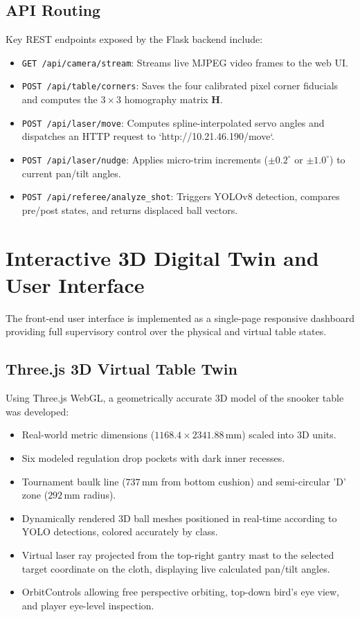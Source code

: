 \subsection{API Routing}
Key REST endpoints exposed by the Flask backend include:
\begin{itemize}
    \item \texttt{GET /api/camera/stream}: Streams live MJPEG video frames to the web UI.
    \item \texttt{POST /api/table/corners}: Saves the four calibrated pixel corner fiducials and computes the $3 \times 3$ homography matrix $\mathbf{H}$.
    \item \texttt{POST /api/laser/move}: Computes spline-interpolated servo angles and dispatches an HTTP request to `http://10.21.46.190/move`.
    \item \texttt{POST /api/laser/nudge}: Applies micro-trim increments ($\pm 0.2^\circ$ or $\pm 1.0^\circ$) to current pan/tilt angles.
    \item \texttt{POST /api/referee/analyze\_shot}: Triggers YOLOv8 detection, compares pre/post states, and returns displaced ball vectors.
\end{itemize}

\section{Interactive 3D Digital Twin and User Interface}
The front-end user interface is implemented as a single-page responsive dashboard providing full supervisory control over the physical and virtual table states.

\subsection{Three.js 3D Virtual Table Twin}
Using Three.js WebGL, a geometrically accurate 3D model of the snooker table was developed:
\begin{itemize}
    \item Real-world metric dimensions ($1168.4 \times 2341.88\,\text{mm}$) scaled into 3D units.
    \item Six modeled regulation drop pockets with dark inner recesses.
    \item Tournament baulk line ($737\,\text{mm}$ from bottom cushion) and semi-circular 'D' zone ($292\,\text{mm}$ radius).
    \item Dynamically rendered 3D ball meshes positioned in real-time according to YOLO detections, colored accurately by class.
    \item Virtual laser ray projected from the top-right gantry mast to the selected target coordinate on the cloth, displaying live calculated pan/tilt angles.
    \item OrbitControls allowing free perspective orbiting, top-down bird's eye view, and player eye-level inspection.
\end{itemize}

